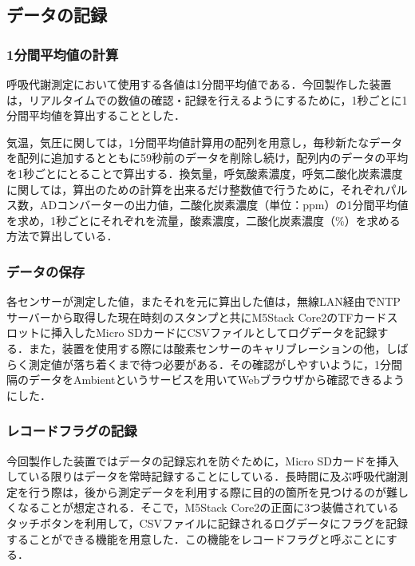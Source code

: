 \subsection{データの記録}

\subsubsection{1分間平均値の計算}

呼吸代謝測定において使用する各値は1分間平均値である．今回製作した装置は，リアルタイムでの数値の確認・記録を行えるようにするために，1秒ごとに1分間平均値を算出することとした．

気温，気圧に関しては，1分間平均値計算用の配列を用意し，毎秒新たなデータを配列に追加するとともに59秒前のデータを削除し続け，配列内のデータの平均を1秒ごとにとることで算出する．換気量，呼気酸素濃度，呼気二酸化炭素濃度に関しては，算出のための計算を出来るだけ整数値で行うために，それぞれパルス数，ADコンバーターの出力値，二酸化炭素濃度（単位：ppm）の1分間平均値を求め，1秒ごとにそれぞれを流量，酸素濃度，二酸化炭素濃度（\%）を求める方法で算出している．

\subsubsection{データの保存}

各センサーが測定した値，またそれを元に算出した値は，無線LAN経由でNTPサーバーから取得した現在時刻のスタンプと共にM5Stack Core2のTFカードスロットに挿入したMicro SDカードにCSVファイルとしてログデータを記録する．また，装置を使用する際には酸素センサーのキャリブレーションの他，しばらく測定値が落ち着くまで待つ必要がある．その確認がしやすいように，1分間隔のデータをAmbientというサービスを用いてWebブラウザから確認できるようにした．

\subsubsection{レコードフラグの記録}

今回製作した装置ではデータの記録忘れを防ぐために，Micro SDカードを挿入している限りはデータを常時記録することにしている．長時間に及ぶ呼吸代謝測定を行う際は，後から測定データを利用する際に目的の箇所を見つけるのが難しくなることが想定される．そこで，M5Stack Core2の正面に3つ装備されているタッチボタンを利用して，CSVファイルに記録されるログデータにフラグを記録することができる機能を用意した．この機能をレコードフラグと呼ぶことにする．

